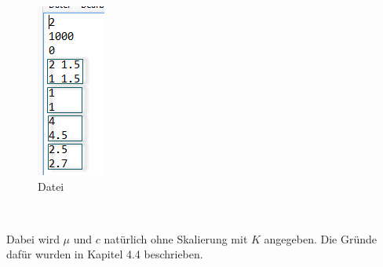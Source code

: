 \documentclass[11pt, a4paper, german]{article}
\theoremstyle{plain}
\begin{document}
	\begin{center}
	\begin{minipage}{0.15\textwidth}
		\begin{figure}[H]
			\centering
			\includegraphics[width=0.9\linewidth]{./Pictures/Parameter}
			\caption{Datei}
			\label{Parameter}
		\end{figure}
	\end{minipage}
	$ \quad $
	\begin{minipage}{0.6\textwidth}
		Dabei wird $ \mu $ und $ c $ natürlich ohne Skalierung mit $ K $ angegeben. Die Gründe dafür wurden in Kapitel 4.4 beschrieben.\\
		

\end{minipage}
\end{center}
\end{document}
